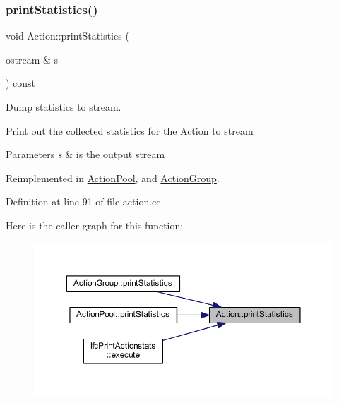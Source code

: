 \subsubsection{\texorpdfstring{printStatistics()}{printStatistics()}}
{\footnotesize\ttfamily void Action\+::print\+Statistics (\begin{DoxyParamCaption}\item[{ostream \&}]{s }\end{DoxyParamCaption}) const\hspace{0.3cm}{\ttfamily [virtual]}}



Dump statistics to stream. 

Print out the collected statistics for the \mbox{\hyperlink{class_action}{Action}} to stream 
\begin{DoxyParams}{Parameters}
{\em s} & is the output stream \\
\hline
\end{DoxyParams}


Reimplemented in \mbox{\hyperlink{class_action_pool_aed2073462c2dc9a3c33a6720f9cfc93b}{Action\+Pool}}, and \mbox{\hyperlink{class_action_group_ac61fd44348c6eabee0ebba16dfc4ff3b}{Action\+Group}}.



Definition at line 91 of file action.\+cc.

Here is the caller graph for this function\+:
\nopagebreak
\begin{figure}[H]
\begin{center}
\leavevmode
\includegraphics[width=350pt]{class_action_a57e38931fcb3bf9dffac2946d5e790be_icgraph}
\end{center}
\end{figure}
\mbox{\label{class_action_ac7c1cf16bb63e0741ba16be5179cf943}} 
